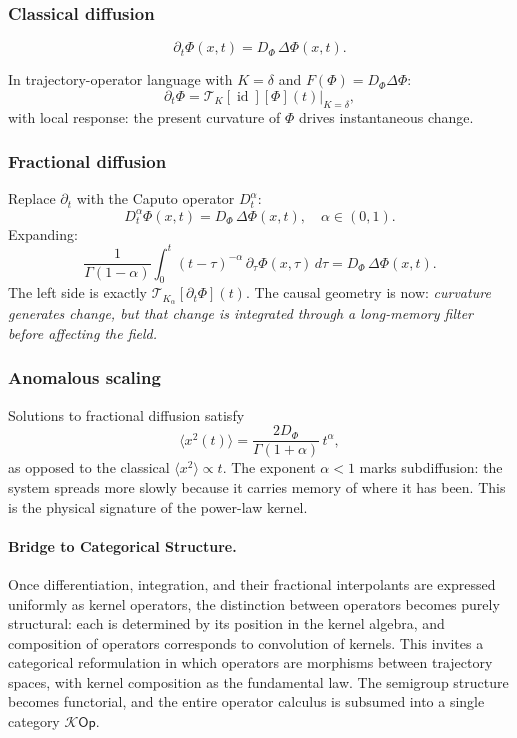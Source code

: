 \documentclass[12pt]{article}
\DeclareMathOperator{\id}{id}
\newcommand{\Kcal}{\mathcal{K}}
\newcommand{\TK}{\mathcal{T}_K}
\begin{document}
\subsubsection{Classical diffusion}

\[
  \partial_t \Phi(x,t) = D_\Phi\, \Delta\Phi(x,t).
\]

In trajectory-operator language with $K = \delta$ and $F(\Phi) = D_\Phi\Delta\Phi$:
\[
  \partial_t \Phi = \TK[\id][\Phi](t)\big|_{K=\delta},
\]
with local response: the present curvature of $\Phi$ drives instantaneous change.

\subsubsection{Fractional diffusion}

Replace $\partial_t$ with the Caputo operator $D^\alpha_t$:
\[
  D^\alpha_t \Phi(x,t) = D_\Phi\, \Delta\Phi(x,t), \quad \alpha \in (0,1).
\]
Expanding:
\[
  \frac{1}{\Gamma(1-\alpha)}\int_0^t (t-\tau)^{-\alpha}\,
  \partial_\tau \Phi(x,\tau)\, d\tau = D_\Phi\, \Delta\Phi(x,t).
\]
The left side is exactly $\mathcal{T}_{K_\alpha}[\partial_t \Phi](t)$.
The causal geometry is now: \textit{curvature generates change, but that
change is integrated through a long-memory filter before affecting the field.}

\subsubsection{Anomalous scaling}

Solutions to fractional diffusion satisfy
\[
  \langle x^2(t)\rangle = \frac{2D_\Phi}{\Gamma(1+\alpha)}\, t^\alpha,
\]
as opposed to the classical $\langle x^2\rangle \propto t$. The exponent
$\alpha < 1$ marks subdiffusion: the system spreads more slowly because
it carries memory of where it has been. This is the physical signature
of the power-law kernel.

\paragraph{Bridge to Categorical Structure.}
Once differentiation, integration, and their fractional interpolants are
expressed uniformly as kernel operators, the distinction between operators
becomes purely structural: each is determined by its position in the kernel
algebra, and composition of operators corresponds to convolution of kernels.
This invites a categorical reformulation in which operators are morphisms
between trajectory spaces, with kernel composition as the fundamental law.
The semigroup structure becomes functorial, and the entire operator calculus
is subsumed into a single category $\Kcal\mathsf{Op}$.
\end{document}
